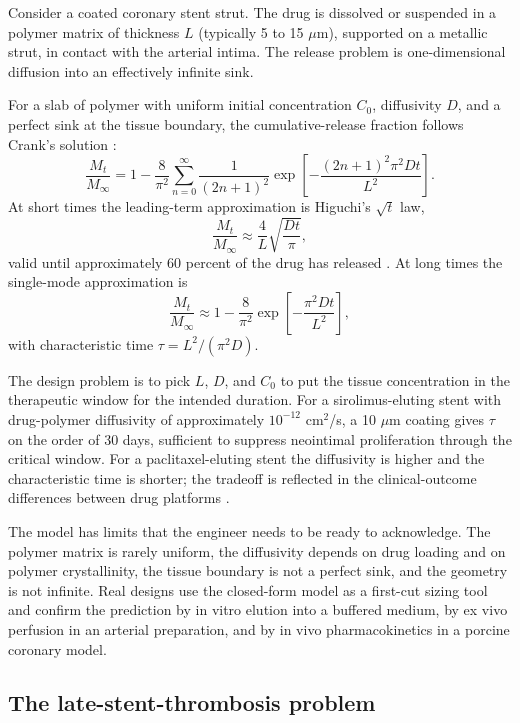 Consider a coated coronary stent strut. The drug is dissolved or
suspended in a polymer matrix of thickness $L$ (typically 5 to 15
$\mu$m), supported on a metallic strut, in contact with the
arterial intima. The release problem is one-dimensional diffusion
into an effectively infinite sink.

For a slab of polymer with uniform initial concentration $C_0$,
diffusivity $D$, and a perfect sink at the tissue boundary, the
cumulative-release fraction follows Crank's solution
\cite{paper:v6c12-crank-diffusion-1975}:
\[
\frac{M_t}{M_\infty} = 1 - \frac{8}{\pi^2}
\sum_{n=0}^\infty \frac{1}{(2n+1)^2}
\exp\!\left[-\frac{(2n+1)^2 \pi^2 D t}{L^2}\right].
\]
At short times the leading-term approximation is Higuchi's
$\sqrt{t}$ law,
\[
\frac{M_t}{M_\infty} \approx \frac{4}{L}\sqrt{\frac{D t}{\pi}},
\]
valid until approximately 60 percent of the drug has released
\cite{paper:v6c12-higuchi-drug-release-1961}. At long times the
single-mode approximation is
\[
\frac{M_t}{M_\infty} \approx 1 - \frac{8}{\pi^2}
\exp\!\left[-\frac{\pi^2 D t}{L^2}\right],
\]
with characteristic time $\tau = L^2 / (\pi^2 D)$.

The design problem is to pick $L$, $D$, and $C_0$ to put the
tissue concentration in the therapeutic window for the intended
duration. For a sirolimus-eluting stent with drug-polymer
diffusivity of approximately $10^{-12}$ cm$^2$/s, a 10 $\mu$m
coating gives $\tau$ on the order of 30 days, sufficient to
suppress neointimal proliferation through the critical window.
For a paclitaxel-eluting stent the diffusivity is higher and the
characteristic time is shorter; the tradeoff is reflected in the
clinical-outcome differences between drug platforms
\cite{paper:v6c12-stone-des-2010}.

The model has limits that the engineer needs to be ready to
acknowledge. The polymer matrix is rarely uniform, the diffusivity
depends on drug loading and on polymer crystallinity, the tissue
boundary is not a perfect sink, and the geometry is not infinite.
Real designs use the closed-form model as a first-cut sizing tool
and confirm the prediction by in vitro elution into a buffered
medium, by ex vivo perfusion in an arterial preparation, and by
in vivo pharmacokinetics in a porcine coronary model.

\subsection{The late-stent-thrombosis problem}

